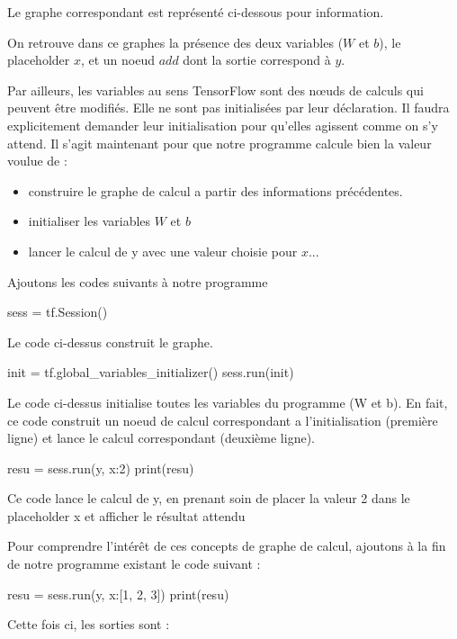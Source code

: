 \documentclass[a4paper,11pt]{book}
\theoremstyle{theo}
\begin{document}
Le graphe correspondant est représenté ci-dessous pour information.

\newpage

On retrouve dans ce graphes la présence des deux variables ($W$ et $b$), le placeholder $x$, et un noeud $add$ dont la sortie correspond à $y$.


Par ailleurs, les variables au sens TensorFlow sont des nœuds de calculs qui peuvent être modifiés. Elle ne sont pas initialisées par leur déclaration. Il faudra explicitement demander leur initialisation pour qu'elles agissent comme on s'y attend.
Il s'agit maintenant pour que notre programme calcule bien la valeur voulue de :
\begin{itemize}
\item construire le graphe de calcul a partir des informations précédentes.
\item initialiser les variables $W$ et $b$
\item lancer le calcul de y avec une valeur choisie pour $x$...
\end{itemize}

Ajoutons les codes suivants à notre programme
\begin{mypython}
sess = tf.Session()
\end{mypython}
Le code ci-dessus construit le graphe.
\begin{mypython}
init = tf.global_variables_initializer()
sess.run(init)
\end{mypython}
Le code ci-dessus initialise toutes les variables du programme (W et b). En fait, ce code construit un noeud de calcul correspondant a l'initialisation (première ligne) et lance le calcul correspondant (deuxième ligne).

\begin{mypython} 
resu = sess.run(y, {x:2}) 
print(resu)
\end{mypython}
Ce code lance le calcul de y, en prenant soin de placer la valeur 2 dans le placeholder x et afficher le résultat attendu
\begin{myoutput}
[0.3]
\end{myoutput}
Pour comprendre l'intérêt de ces concepts de graphe de calcul, ajoutons à la fin de notre programme existant le code suivant :

\begin{mypython} 
resu = sess.run(y, {x:[1, 2, 3]}) 
print(resu)
\end{mypython} 

Cette fois ci, les sorties sont :
\end{document}
